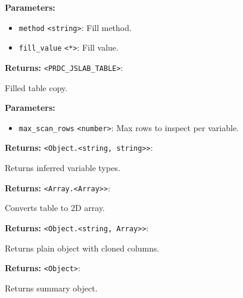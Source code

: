 \documentclass[12pt,a4paper]{article}
\begin{document}
\noindent \textbf{Parameters:}
\begin{itemize}
  \item \texttt{method} \texttt{<string>}: Fill method.
  \item \texttt{fill\_value} \texttt{<*>}: Fill value.
\end{itemize}

\noindent \textbf{Returns:} \texttt{<PRDC\_JSLAB\_TABLE>}:

\noindent Filled table copy.

\vspace{5mm}
\noindent {}


\noindent \textbf{Parameters:}
\begin{itemize}
  \item \texttt{max\_scan\_rows} \texttt{<number>}: Max rows to inspect per variable.
\end{itemize}

\noindent \textbf{Returns:} \texttt{<Object.<string, string>>}:

\noindent Returns inferred variable types.

\vspace{5mm}
\noindent {}


\noindent \textbf{Returns:} \texttt{<Array.<Array>>}:

\noindent Converts table to 2D array.

\vspace{5mm}
\noindent {}


\noindent \textbf{Returns:} \texttt{<Object.<string, Array>>}:

\noindent Returns plain object with cloned columns.

\vspace{5mm}
\noindent {}


\noindent \textbf{Returns:} \texttt{<Object>}:

\noindent Returns summary object.
\end{document}
